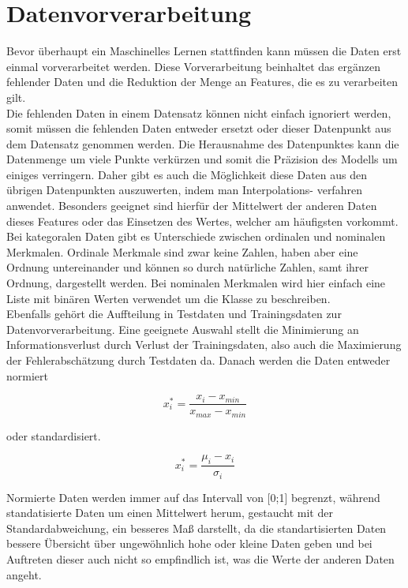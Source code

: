 \documentclass[11pt]{article} %
\begin{document}
\section{Datenvorverarbeitung}

Bevor überhaupt ein Maschinelles Lernen stattfinden kann müssen die Daten erst einmal vorverarbeitet
werden. Diese Vorverarbeitung beinhaltet das ergänzen fehlender Daten und die Reduktion der Menge an 
Features, die es zu verarbeiten gilt. \\
Die fehlenden Daten in einem Datensatz können nicht einfach ignoriert werden, somit müssen die fehlenden Daten
entweder ersetzt oder dieser Datenpunkt aus dem Datensatz genommen werden. Die Herausnahme des Datenpunktes
kann die Datenmenge um viele Punkte verkürzen und somit die Präzision des Modells um einiges verringern.
Daher gibt es auch die Möglichkeit diese Daten aus den übrigen Datenpunkten auszuwerten, indem man Interpolations-
verfahren anwendet. Besonders geeignet sind hierfür der Mittelwert der anderen Daten dieses Features oder 
das Einsetzen des Wertes, welcher am häufigsten vorkommt. 
\\
Bei kategoralen Daten gibt es Unterschiede zwischen ordinalen und nominalen Merkmalen. Ordinale Merkmale sind
zwar keine Zahlen, haben aber eine Ordnung untereinander und können so durch natürliche Zahlen, samt ihrer Ordnung,
dargestellt werden. Bei nominalen Merkmalen wird hier einfach eine Liste mit binären Werten verwendet um die Klasse
zu beschreiben.
\\
Ebenfalls gehört die Auffteilung in Testdaten und Trainingsdaten zur Datenvorverarbeitung. Eine geeignete Auswahl
stellt die Minimierung an Informationsverlust durch Verlust der Trainingsdaten, also auch die Maximierung der
Fehlerabschätzung durch Testdaten da. Danach werden die Daten entweder normiert 

\begin{equation}
x_i^* = \frac{x_i-x_{min}}{x_{max}-x_{min}}
\end{equation}

oder standardisiert.

\begin{equation}
x_i^* = \frac{\mu_i -x_{i} }{\sigma_i}
\end{equation}
 
Normierte Daten werden immer auf das Intervall von [0;1] begrenzt, während standatisierte Daten um einen Mittelwert
herum, gestaucht mit der Standardabweichung, ein besseres Maß darstellt, da die standartisierten Daten bessere
Übersicht über ungewöhnlich hohe oder kleine Daten geben und bei Auftreten dieser auch nicht so empfindlich ist,
was die Werte der anderen Daten angeht.
\end{document}
